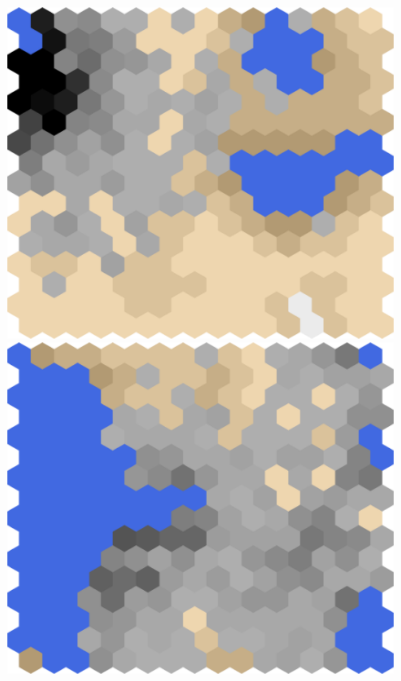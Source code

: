 \documentclass[conference]{IEEEtran}
\theoremstyle{definition}
\begin{document}
\begin{figure}
	\centering
	\begin{minipage}{.19\textwidth}
		\centering
		\includegraphics[width=\textwidth]{tf-a}
	\end{minipage}
	\begin{minipage}{.19\textwidth}
		\centering
		\includegraphics[width=\textwidth]{tf-b}
	\end{minipage}
	\begin{minipage}{.19\textwidth}

\end{minipage}
\end{figure}
\end{document}
